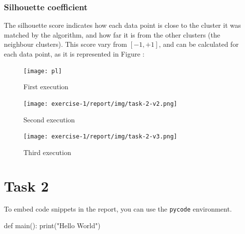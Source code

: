 \documentclass[12pt]{article}
\begin{document}
\subsubsection{Silhouette coefficient}

The silhouette score indicates how each data point is close to the cluster it was matched by the algorithm, and how far it is from the other clusters (the neighbour clusters). This score vary from $[-1, +1]$, and can be calculated for each data point, as it is represented in Figure :

\begin{figure}[H]
   \begin{minipage}{0.32\textwidth}
     \centering
     \texttt{[image: pl]}
     \caption{First execution}
     \label{fig:task-2-v1}
   \end{minipage}\hfill
   \begin{minipage}{0.32\textwidth}
     \centering
     \texttt{[image: exercise-1/report/img/task-2-v2.png]}
     \caption{Second execution}
     \label{fig:task-2-v2}
   \end{minipage}
   \begin{minipage}{0.32\textwidth}
     \centering
     \texttt{[image: exercise-1/report/img/task-2-v3.png]}
     \caption{Third execution}
     \label{fig:task-2-v3}
   \end{minipage}
\end{figure}



































\section{Task 2}
To embed code snippets in the report, you can use the \texttt{pycode} environment.

\begin{pycode}
def main():
    print("Hello World")
\end{pycode}
\end{document}
